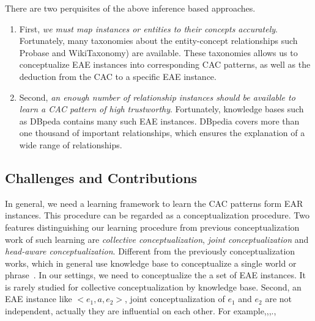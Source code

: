 There are two perquisites of the above inference based approaches.
\begin{enumerate}
\item First, {\it we must map instances or entities to their concepts accurately}. Fortunately, many taxonomies about the entity-concept relationships such \ac{Probase} and \ac{WikiTaxonomy}) are available. These taxonomies allows us to conceptualize EAE instances into corresponding CAC patterns, as well as the deduction from the CAC to a specific EAE instance.
\item Second, {\it an enough number of relationship instances should be available to learn a CAC pattern of high trustworthy}. Fortunately, knowledge bases such as \ac{DBpeda} contains many such EAE instances. DBpedia covers more than one thousand of important relationships, which ensures the explanation of a wide range of relationships.
\end{enumerate}




\subsection{Challenges and Contributions}

In general, we need a learning framework to learn the CAC patterns form EAR instances.
This procedure can be regarded as a conceptualization procedure.
Two features distinguishing our learning procedure from previous conceptualization work of such learning are {\it collective conceptualization}, {\it joint conceptualization} and {\it head-aware conceptualization}.
Different from the previously conceptualization works, which in general use knowledge base to conceptualize a single world or phrase~\cite{song2011short,kim2013context}.
In our settings, we need to conceptualize the a set of EAE instances. It is rarely studied for collective conceptualization by knowledge base.
Second, an EAE instance like $<e_1, a, e_2>$, joint conceptualization of $e_1$ and $e_2$ are not independent, actually they are influential on each other. For example,,,.,

